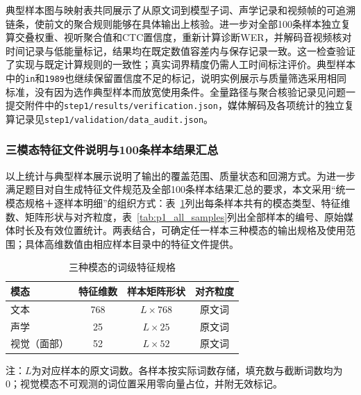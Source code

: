 典型样本图与映射表共同展示了从原文词到模型子词、声学记录和视频帧的可追溯链条，使前文的聚合规则能够在具体输出上核验。进一步对全部100条样本独立复算交叠权重、视听聚合值和CTC置信度，重新计算诊断WER，并解码音视频核对时间记录与低能量标记，结果均在既定数值容差内与保存记录一致。这一检查验证了实现与既定计算规则的一致性；真实词界精度仍需人工时间标注评价。典型样本中的\texttt{in}和\texttt{1989}也继续保留置信度不足的标记，说明实例展示与质量筛选采用相同标准，没有因为选作典型样本而放宽使用条件。全量路径与聚合核验记录见问题一提交附件中的\nolinkurl{step1/results/verification.json}，媒体解码及各项统计的独立复算记录见\nolinkurl{step1/validation/data_audit.json}。

\subsubsection{三模态特征文件说明与100条样本结果汇总}
\label{sec:p1_delivery}

以上统计与典型样本展示说明了输出的覆盖范围、质量状态和回溯方式。为进一步满足题目对自生成特征文件规范及全部100条样本结果汇总的要求，本文采用“统一模态规格＋逐样本明细”的组织方式：表~\ref{tab:p1_feature_specification}列出每条样本共有的模态类型、特征维数、矩阵形状与对齐粒度，表~\ref{tab:p1_all_samples}列出全部样本的编号、原始媒体时长及有效位置统计。两表结合，可确定任一样本三种模态的输出规格及使用范围；具体高维数值由相应样本目录中的特征文件提供。

\begin{table}[H]
    \centering\small
    \caption{三种模态的词级特征规格}
    \label{tab:p1_feature_specification}
    \setlength{\tabcolsep}{6pt}
    \renewcommand{\arraystretch}{1.12}
    \ifdefined\pOneCompactTableBox\else\newsavebox{\pOneCompactTableBox}\fi
    \begin{lrbox}{\pOneCompactTableBox}
    \begin{tabular}{lccc}
        \toprule
        模态 & 特征维数 & 样本矩阵形状 & 对齐粒度\\
        \midrule
        文本 & 768 & $L\times768$ & 原文词\\
        声学 & 25 & $L\times25$ & 原文词\\
        视觉（面部） & 52 & $L\times52$ & 原文词\\
        \bottomrule
    \end{tabular}
    \end{lrbox}
    \usebox{\pOneCompactTableBox}
\par\smallskip
\parbox{\wd\pOneCompactTableBox}{\footnotesize 注：$L$为对应样本的原文词数。各样本按实际词数存储，填充数与截断词数均为0；视觉模态不可观测的词位置采用零向量占位，并附无效标记。}
\end{table}

